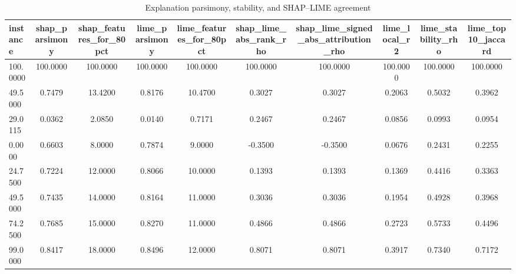 \begin{table}
\centering
\caption{Explanation parsimony, stability, and SHAP--LIME agreement}
\label{tab:explanation_quality}
\begin{tabular}{lccccccccc}
\toprule
instance & shap_parsimony & shap_features_for_80pct & lime_parsimony & lime_features_for_80pct & shap_lime_abs_rank_rho & shap_lime_signed_abs_attribution_rho & lime_local_r2 & lime_stability_rho & lime_top10_jaccard \\
\midrule
100.0000 & 100.0000 & 100.0000 & 100.0000 & 100.0000 & 100.0000 & 100.0000 & 100.0000 & 100.0000 & 100.0000 \\
49.5000 & 0.7479 & 13.4200 & 0.8176 & 10.4700 & 0.3027 & 0.3027 & 0.2063 & 0.5032 & 0.3962 \\
29.0115 & 0.0362 & 2.0850 & 0.0140 & 0.7171 & 0.2467 & 0.2467 & 0.0856 & 0.0993 & 0.0954 \\
0.0000 & 0.6603 & 8.0000 & 0.7874 & 9.0000 & -0.3500 & -0.3500 & 0.0676 & 0.2431 & 0.2255 \\
24.7500 & 0.7224 & 12.0000 & 0.8066 & 10.0000 & 0.1393 & 0.1393 & 0.1369 & 0.4416 & 0.3363 \\
49.5000 & 0.7435 & 14.0000 & 0.8164 & 11.0000 & 0.3036 & 0.3036 & 0.1954 & 0.4928 & 0.3968 \\
74.2500 & 0.7685 & 15.0000 & 0.8270 & 11.0000 & 0.4866 & 0.4866 & 0.2723 & 0.5733 & 0.4496 \\
99.0000 & 0.8417 & 18.0000 & 0.8496 & 12.0000 & 0.8071 & 0.8071 & 0.3917 & 0.7340 & 0.7172 \\
\bottomrule
\end{tabular}
\end{table}
